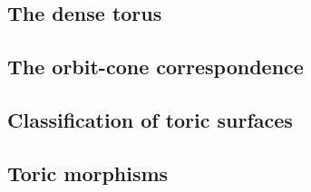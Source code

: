 \documentclass[12pt]{amsart}
\theoremstyle{plain}
\begin{document}
\subsection{The dense torus}





\subsection{The orbit-cone correspondence}





\subsection{Classification of toric surfaces}





\subsection{Toric morphisms}
\end{document}
